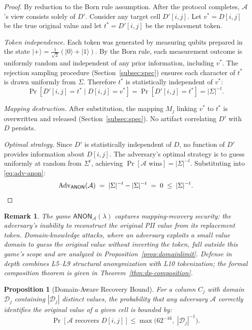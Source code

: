 \documentclass[journal]{IEEEtran}
\newtheorem{proposition}[theorem]{Proposition}
\newtheorem*{remark}{Remark}
\begin{document}
\begin{proof}
By reduction to the Born rule assumption. After the protocol completes, $\mathcal{A}$'s view consists solely of $D'$. Consider any target cell $D'[i,j]$. Let $v^* = D[i,j]$ be the true original value and let $t^* = D'[i,j]$ be the replacement token.

\emph{Token independence.} Each token was generated by measuring qubits prepared in the state $|{+}\rangle = \frac{1}{\sqrt{2}}(|0\rangle + |1\rangle)$. By the Born rule, each measurement outcome is uniformly random and independent of any prior information, including $v^*$. The rejection sampling procedure (Section~\ref{subsec:spec}) ensures each character of $t^*$ is drawn uniformly from $\Sigma$. Therefore $t^*$ is statistically independent of $v^*$:
\[
\Pr[D'[i,j] {=} t^* \mid D[i,j] {=} v^*]
  = \Pr[D'[i,j] {=} t^*] = |\Sigma|^{-t}.
\]

\emph{Mapping destruction.} After substitution, the mapping $M_j$ linking $v^*$ to $t^*$ is overwritten and released (Section~\ref{subsec:spec}). No artifact correlating $D'$ with $D$ persists.

\emph{Optimal strategy.} Since $D'$ is statistically independent of $D$, no function of $D'$ provides information about $D[i,j]$. The adversary's optimal strategy is to guess uniformly at random from $\Sigma^t$, achieving $\Pr[\mathcal{A}\text{ wins}] = |\Sigma|^{-t}$. Substituting into \eqref{eq:adv-anon}:
\[
\mathrm{Adv}_{\mathsf{ANON}}(\mathcal{A}) \;=\; |\Sigma|^{-t} - |\Sigma|^{-t} \;=\; 0 \;\leq\; |\Sigma|^{-t}. \qedhere
\]
\end{proof}

\begin{remark}
The game $\mathsf{ANON}_{\mathcal{A}}(\lambda)$ captures \emph{mapping-recovery} security: the adversary's inability to reconstruct the original PII value from its replacement token. Domain-knowledge attacks, where an adversary exploits a small value domain to guess the original value without inverting the token, fall outside this game's scope and are analyzed in Proposition~\ref{prop:domainlimit}. Defense in depth combines L5--L9 structural anonymization with L10 tokenization; the formal composition theorem is given in Theorem~\ref{thm:dp-composition}.
\end{remark}

\begin{proposition}[Domain-Aware Recovery Bound]
\label{prop:domain}
For a column $C_j$ with domain $\mathcal{D}_j$ containing $|\mathcal{D}_j|$ distinct values, the probability that any adversary $\mathcal{A}$ correctly identifies the original value of a given cell is bounded by:
\begin{equation}
\Pr[\mathcal{A} \text{ recovers } D[i,j]] \leq \max\bigl(62^{-16},\; |\mathcal{D}_j|^{-1}\bigr).
\end{equation}
\end{proposition}
\end{document}
